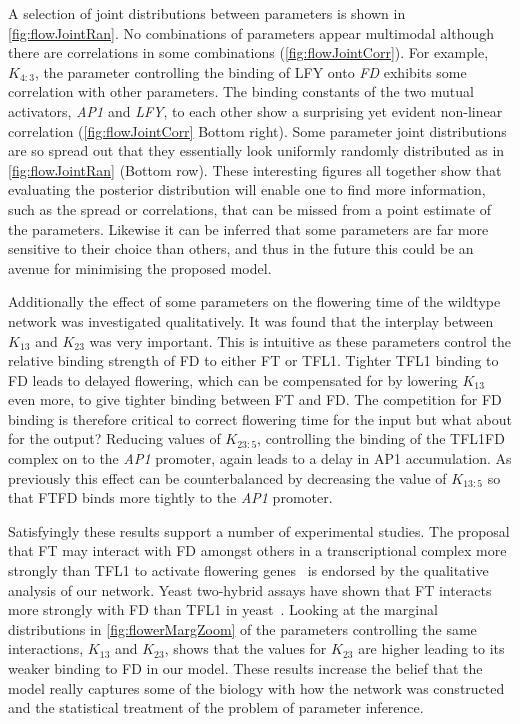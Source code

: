 A selection of joint distributions between parameters is shown in \autoref{fig:flowJointRan}.
No combinations of parameters appear multimodal although there are correlations in some combinations (\autoref{fig:flowJointCorr}).
For example, $K_{4:3}$, the parameter controlling the binding of LFY onto \emph{FD} exhibits some correlation with other parameters.
The binding constants of the two mutual activators, \emph{AP1} and \emph{LFY}, to each other show a surprising yet evident non-linear correlation (\autoref{fig:flowJointCorr} Bottom right).
Some parameter joint distributions are so spread out that they essentially look uniformly randomly distributed as in \autoref{fig:flowJointRan} (Bottom row).
These interesting figures all together show that evaluating the posterior distribution will enable one to find more information, such as the spread or correlations, that can be missed from a point estimate of the parameters.
Likewise it can be inferred that some parameters are far more sensitive to their choice than others, and thus in the future this could be an avenue for minimising the proposed model.

Additionally the effect of some parameters on the flowering time of the wildtype network was investigated qualitatively.
It was found that the interplay between $K_{13}$ and $K_{23}$ was very important.
This is intuitive as these parameters control the relative binding strength of FD to either FT or TFL1.
Tighter TFL1 binding to FD leads to delayed flowering, which can be compensated for by lowering $K_{13}$ even more, to give tighter binding between FT and FD.
The competition for FD binding is therefore critical to correct flowering time for the input but what about for the output?
Reducing values of $K_{23:5}$, controlling the binding of the TFL1FD complex on to the \emph{AP1} promoter, again leads to a delay in AP1 accumulation.
As previously this effect can be counterbalanced by decreasing the value of $K_{13:5}$ so that FTFD binds more tightly to the \emph{AP1} promoter.

Satisfyingly these results support a number of experimental studies.
The proposal that FT may interact with FD amongst others in a transcriptional complex more strongly than TFL1 to activate flowering genes~\cite{hanano2011} is endorsed by the qualitative analysis of our network.
Yeast two-hybrid assays have shown that FT interacts more strongly with FD than TFL1 in yeast~\cite{abe2005,hanano2011}.
Looking at the marginal distributions in \autoref{fig:flowerMargZoom} of the parameters controlling the same interactions, $K_{13}$ and $K_{23}$, shows that the values for $K_{23}$ are higher leading to its weaker binding to FD in our model.
These results increase the belief that the model really captures some of the biology with how the network was constructed and the statistical treatment of the problem of parameter inference.

